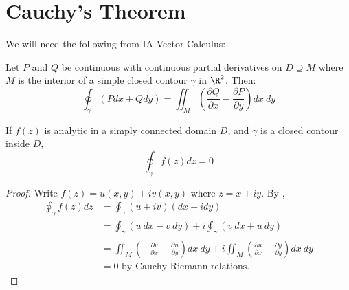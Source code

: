 \documentclass[../Main.tex]{subfiles}
\begin{document}
\section{Cauchy's Theorem}
We will need the following from IA Vector Calculus:
\begin{theorem}
    Let $P$ and $Q$ be continuous with continuous partial derivatives on $D \supseteq M$ where $M$ is the interior of a simple closed contour $\gamma$ in $\R^2$. Then:
    \begin{equation}
        \oint_\gamma (Pdx + Qdy) = \iint_M\left(\frac{\partial Q}{\partial x} - \frac{\partial P}{\partial y}\right)dx~dy
        \label{eqnGreen}
    \end{equation}
    \label{thmGreen}
\end{theorem}
\begin{theorem}
    If $f(z)$ is analytic in a simply connected domain $D$, and $\gamma$ is a closed contour inside $D$,
    \begin{equation}
        \oint_\gamma f(z) dz = 0
        \label{eqnCauchy}
    \end{equation}
    \label{thmCauchy}
\end{theorem}
\begin{proof}
    Write $f(z) = u(x, y) + i v(x, y)$ where $z = x + iy$. By ,
    \begin{align*}
        \oint_{\gamma} f(z) dz &= \oint_\gamma (u + i v)(dx + i dy) \\
        &= \oint_\gamma (u~dx - v~dy) + i \oint_\gamma(v~dx + u~dy) \\
        &= \iint_M \left(-\frac{\partial v}{\partial x} - \frac{\partial u}{\partial y}\right) dx~dy + i \iint_M \left(\frac{\partial u}{\partial x} - \frac{\partial y}{\partial y}\right) dx~dy \\
        &= 0 \text{ by Cauchy-Riemann relations}.
    \end{align*}
\end{proof}
\end{document}
